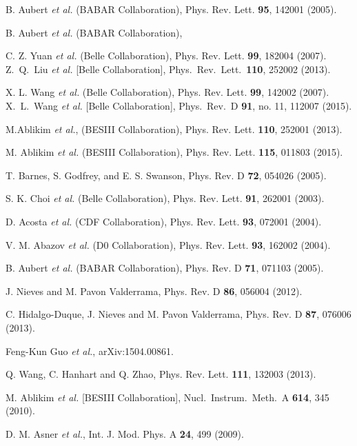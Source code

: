 \documentclass[aps,preprint,superscriptaddress,12pt,tightenlines]{revtex4}
\def\Journal#1#2#3#4{{#1} {\bf #2}, #3 (#4)}
\def\IJMP{Int. J. Mod. Phys. A}
\begin{document}
\begin{thebibliography}{**}

 B. Aubert {\em et al.} (BABAR Collaboration),
Phys. Rev. Lett. {\bf 95}, 142001 (2005).

 B. Aubert {\em et al.} (BABAR Collaboration),

 C. Z. Yuan {\em et al.} (Belle Collaboration),
Phys. Rev. Lett. {\bf 99}, 182004 (2007). Z.~Q.~Liu {\it et al.}
[Belle Collaboration], Phys.\ Rev.\ Lett.\  {\bf 110}, 252002
(2013).

 X. L. Wang  {\em et al.} (Belle Collaboration),
Phys. Rev. Lett. {\bf 99}, 142002 (2007).  X.~L.~Wang {\it et al.}
[Belle Collaboration], Phys.\ Rev.\ D {\bf 91}, no. 11, 112007
(2015).

 M.Ablikim {\em et al.}, (BESIII Collaboration),
Phys. Rev. Lett. {\bf 110}, 252001 (2013).

 M. Ablikim {\em et al.} (BESIII Collaboration),
Phys. Rev. Lett. {\bf 115}, 011803 (2015).

 T. Barnes, S. Godfrey, and E. S. Swanson,
Phys. Rev. D {\bf 72}, 054026 (2005).

 S. K. Choi {\em et al.} (Belle Collaboration),
Phys. Rev. Lett. {\bf 91}, 262001 (2003).

 D. Acosta {\em et al.} (CDF Collaboration),
Phys. Rev. Lett. {\bf 93}, 072001 (2004).

 V. M. Abazov {\em et al.} (D0 Collaboration),
Phys. Rev. Lett. {\bf 93}, 162002 (2004).

 B. Aubert {\em et al.} (BABAR Collaboration),
Phys. Rev. D {\bf 71}, 071103 (2005).

 J. Nieves and M. Pavon Valderrama,
Phys. Rev. D {\bf 86}, 056004 (2012).

 C. Hidalgo-Duque, J. Nieves and
M. Pavon Valderrama, Phys. Rev. D {\bf 87}, 076006 (2013).

 Feng-Kun Guo {\em et al.},
arXiv:1504.00861.

Q. Wang, C. Hanhart and Q. Zhao,
Phys. Rev. Lett. {\bf 111}, 132003 (2013).

 M. Ablikim {\em et al.} [BESIII Collaboration],
Nucl.\ Instrum.\ Meth.\ A {\bf 614}, 345 (2010).

 D. M. Asner {\em et al.},
\Journal\IJMP{24}{499}{2009}.


\end{thebibliography}
\end{document}
